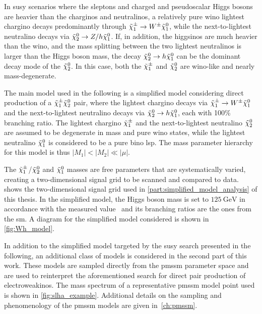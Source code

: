 
In \gls{susy} scenarios where the sleptons and charged and pseudoscalar Higgs bosons are heavier than the charginos and neutralinos, a relatively pure wino lightest chargino decays predominantly through $\tilde{\chi}_1^\pm\rightarrow W^\pm\tilde{\chi}_1^0$, while the next-to-lightest neutralino decays via $\tilde{\chi}_2^0\rightarrow Z/h\tilde{\chi}_1^0$. If, in addition, the higgsinos are much heavier than the wino, and the mass splitting between the two lightest neutralinos is larger than the Higgs boson mass, the decay $\tilde{\chi}_2^0\rightarrow h\tilde{\chi}_1^0$ can be the dominant decay mode of the $\tilde{\chi}_2^0$. In this case, both the $\tilde{\chi}_1^\pm$ and $\tilde{\chi}_2^0$ are wino-like and nearly mass-degenerate.

The main model used in the following is a simplified model considering direct production of a $\tilde{\chi}_1^\pm\tilde{\chi}_2^0$ pair, where the lightest chargino decays via $\tilde{\chi}_1^\pm\rightarrow W^\pm\tilde{\chi}_1^0$ and the next-to-lightest neutralino decays via $\tilde{\chi}_2^0\rightarrow h\tilde{\chi}_1^0$, each with 100\% branching ratio.
The lightest chargino $\tilde{\chi}_1^\pm$ and the next-to-lightest neutralino $\tilde{\chi}_2^0$ are assumed to be degenerate in mass and pure wino states, while the lightest neutralino $\tilde{\chi}_1^0$ is considered to be a pure bino \gls{lsp}.
The mass parameter hierarchy for this model is thus \mbox{$\vert M_1 \vert < \vert M_2 \vert \ll \vert\mu\vert$}. 

The $\tilde{\chi}_1^\pm$/$\tilde{\chi}_2^0$ and $\tilde{\chi}_1^0$ masses are free parameters that are systematically varied, creating a two-dimensional signal grid to be scanned and compared to data.  shows the two-dimensional signal grid used in \cref{part:simplified_model_analysis} of this thesis. In the simplified model, the Higgs boson mass is set to $\SI{125}{\GeV}$ in accordance with the measured value~\cite{HIGG-2012-27,CMS-HIG-12-028} and its branching ratios are the ones from the \gls{sm}. A diagram for the simplified model considered is shown in \cref{fig:Wh_model}.

In addition to the simplified model targeted by the \gls{susy} search presented in the following, an additional class of models is considered in the second part of this work. These models are sampled directly from the \gls{pmssm} parameter space and are used to reinterpret the aforementioned search for direct pair production of electroweakinos. The mass spectrum of a representative \gls{pmssm} model point used is shown in \cref{fig:slha_example}. Additional details on the sampling and phenomenology of the \gls{pmssm} models are given in~\cref{ch:pmssm}. 


